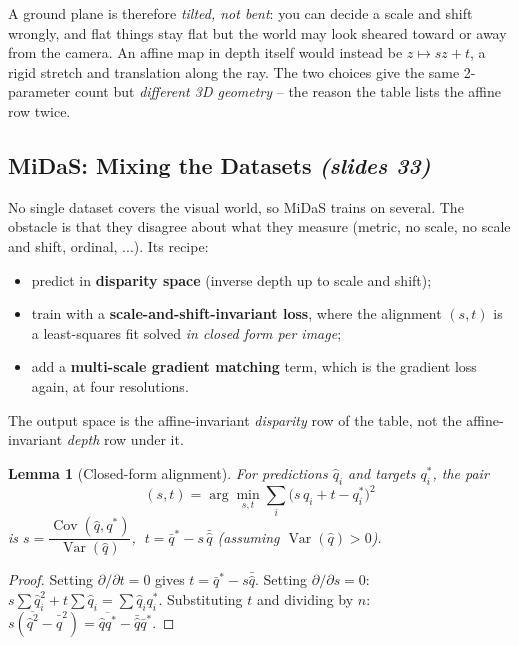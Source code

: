 \documentclass[11pt,a4paper]{article}
\numberwithin{equation}{section}
\newcommand{\slides}[1]{\texorpdfstring{\;\emph{(slides #1)}}{ (slides #1)}}
\theoremstyle{plain}
\newtheorem{lemma}[theorem]{Lemma}
\theoremstyle{definition}
\begin{document}
\begin{intuition}
A ground plane is therefore \emph{tilted, not bent}: you can decide a scale and shift wrongly, and flat things stay flat but the world may look sheared toward or away from the camera. An affine map in depth itself would instead be $z\mapsto sz+t$, a rigid stretch and translation along the ray. The two choices give the same 2-parameter count but \emph{different 3D geometry} -- the reason the table lists the affine row twice.
\end{intuition}
 
\subsection{MiDaS: Mixing the Datasets \slides{33}}
 
No single dataset covers the visual world, so MiDaS trains on several. The obstacle is that they disagree about what they measure (metric, no scale, no scale and shift, ordinal, ...). Its recipe:
\begin{itemize}
\item predict in \textbf{disparity space} (inverse depth up to scale and shift);
\item train with a \textbf{scale-and-shift-invariant loss}, where the alignment $(s,t)$ is a least-squares fit solved \emph{in closed form per image};
\item add a \textbf{multi-scale gradient matching} term, which is the gradient loss again, at four resolutions.
\end{itemize}
The output space is the affine-invariant \emph{disparity} row of the table, not the affine-invariant \emph{depth} row under it.
 
\begin{lemma}[Closed-form alignment]\label{lem:ssi}
For predictions $\hat q_i$ and targets $q^\ast_i$, the pair
\[
(s,t)=\arg\min_{s,t}\sum_i\big(s\,\hat q_i+t-q^\ast_i\big)^2
\]
is $s=\dfrac{\operatorname{Cov}(\hat q,q^\ast)}{\operatorname{Var}(\hat q)}$, $\;t=\bar q^\ast-s\,\bar{\hat q}$ (assuming $\operatorname{Var}(\hat q)>0$).
\end{lemma}
\begin{proof}
Setting $\partial/\partial t=0$ gives $t=\bar q^\ast-s\bar{\hat q}$. Setting $\partial/\partial s=0$: $s\sum\hat q_i^2+t\sum\hat q_i=\sum\hat q_iq_i^\ast$. Substituting $t$ and dividing by $n$: $s(\overline{\hat q^2}-\bar{\hat q}^2)=\overline{\hat qq^\ast}-\bar{\hat q}\bar q^\ast$. \qedhere
\end{proof}
 
\end{document}
